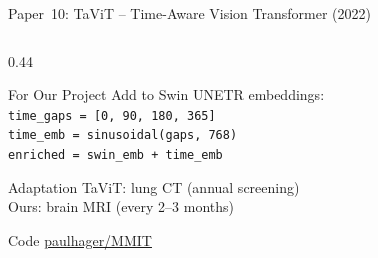 \documentclass[aspectratio=169,xcolor=dvipsnames]{beamer}
\begin{document}
\begin{frame}{Paper~10: TaViT -- Time-Aware Vision Transformer (2022)}
\begin{columns}
        \begin{column}{0.44\textwidth}
            \begin{block}{For Our Project}
                \scriptsize
                Add to Swin UNETR embeddings:\\[0.1em]
                \texttt{time\_gaps = [0, 90, 180, 365]}\\
                \texttt{time\_emb = sinusoidal(gaps, 768)}\\
                \texttt{enriched = swin\_emb + time\_emb}
            \end{block}

            \vspace{0.1em}

            \begin{block}{\small Adaptation}
                \scriptsize
                TaViT: lung CT (annual screening)\\
                Ours: brain MRI (every 2--3 months)
            \end{block}

            \vspace{0.1em}

            \begin{exampleblock}{\scriptsize {} Code}
                \scriptsize \href{https://github.com/paulhager/MMIT}{paulhager/MMIT}
            \end{exampleblock}
        \end{column}
    \end{columns}
\end{frame}
\end{document}
